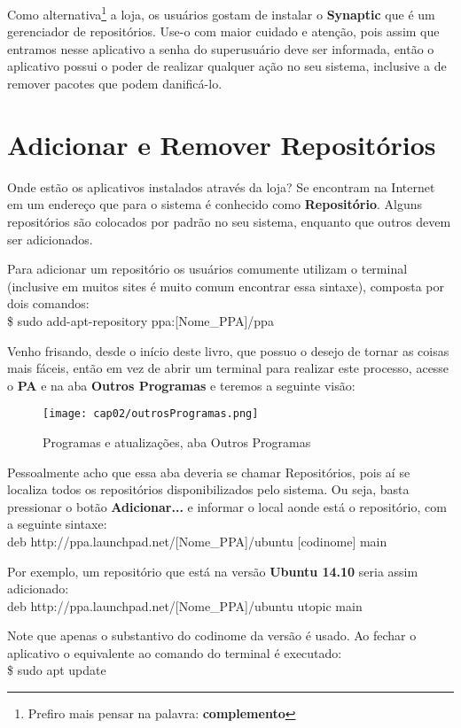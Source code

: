 Como alternativa\footnote{Prefiro mais pensar na palavra: \textbf{complemento}} a loja, os usuários gostam de instalar o \textbf{Synaptic} que é um gerenciador de repositórios. Use-o com maior cuidado e atenção, pois assim que entramos nesse aplicativo a senha do superusuário deve ser informada, então o aplicativo possui o poder de realizar qualquer ação no seu sistema, inclusive a de remover pacotes que podem danificá-lo.

\section{Adicionar e Remover Repositórios}
Onde estão os aplicativos instalados através da loja? Se encontram na Internet em um endereço que para o sistema é conhecido como \textbf{Repositório}. Alguns repositórios são colocados por padrão no seu sistema, enquanto que outros devem ser adicionados.

Para adicionar um repositório os usuários comumente utilizam o terminal (inclusive em muitos sites é muito comum encontrar essa sintaxe), composta por dois comandos: \\
{\ttfamily\$ sudo add-apt-repository ppa:[Nome\_PPA]/ppa}

Venho frisando, desde o início deste livro, que possuo o desejo de tornar as coisas mais fáceis, então em vez de abrir um terminal para realizar este processo, acesse o \textbf{PA} e na aba \textbf{Outros Programas} e teremos a seguinte visão:
\begin{figure}[H]
 \centering\texttt{[image: cap02/outrosProgramas.png]}
 \caption{Programas e atualizações, aba Outros Programas}
\end{figure}

Pessoalmente acho que essa aba deveria se chamar Repositórios, pois aí se localiza todos os repositórios disponibilizados pelo sistema. Ou seja, basta pressionar o botão \textbf{Adicionar...} e informar o local aonde está o repositório, com a seguinte sintaxe: \\
{\ttfamily deb http://ppa.launchpad.net/[Nome\_PPA]/ubuntu [codinome] main}

Por exemplo, um repositório que está na versão \textbf{Ubuntu 14.10} seria assim adicionado: \\
{\ttfamily deb http://ppa.launchpad.net/[Nome\_PPA]/ubuntu utopic main}

Note que apenas o substantivo do codinome da versão é usado. Ao fechar o aplicativo o equivalente ao comando do terminal é executado: \\
{\ttfamily\$ sudo apt update}

